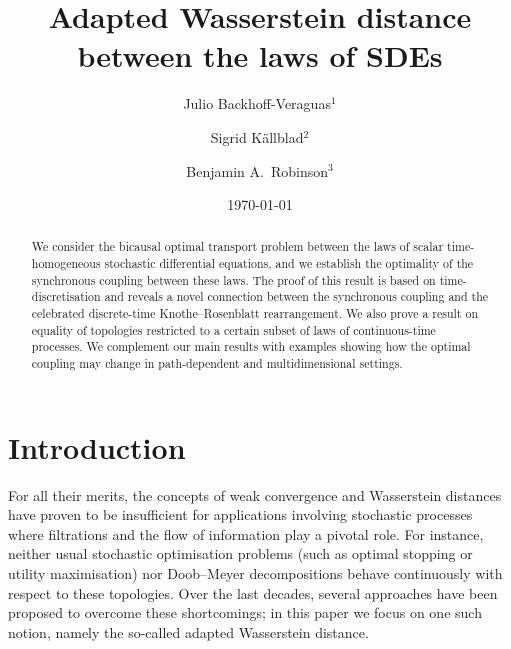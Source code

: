 \documentclass[oneside]{amsart}
\author{Julio Backhoff-Veraguas$^1$}
\author{Sigrid K\"allblad$^2$}
\author{Benjamin A.\ Robinson$^3$}
\title[Adapted Wasserstein distance for SDEs]{Adapted Wasserstein distance between the laws of SDEs}
\date{\today}
\theoremstyle{definition}
\numberwithin{equation}{section}
\begin{document}
\begin{abstract}
	We consider the bicausal optimal transport problem between the laws of scalar time-homogeneous stochastic differential equations, and we establish the optimality of the synchronous coupling between these laws. The proof of this result is based on time-discretisation and reveals a novel connection between the synchronous coupling and the celebrated discrete-time Knothe--Rosenblatt rearrangement. We also prove a result on equality of topologies restricted to a certain subset of laws of continuous-time processes. We complement our main results with examples showing how the optimal coupling may change in path-dependent and multidimensional settings.
\end{abstract}

\maketitle

\section{Introduction}
For all their merits, the concepts of weak convergence and Wasserstein distances have proven to be insufficient for applications involving stochastic processes where filtrations and the flow of information play a pivotal role. For instance, neither usual stochastic optimisation problems (such as optimal stopping or utility maximisation) nor Doob--Meyer decompositions behave continuously with respect to these topologies. 
Over the last decades, several approaches have been proposed to overcome these shortcomings; in this paper we focus on one such notion, namely the so-called adapted Wasserstein distance.
\end{document}
